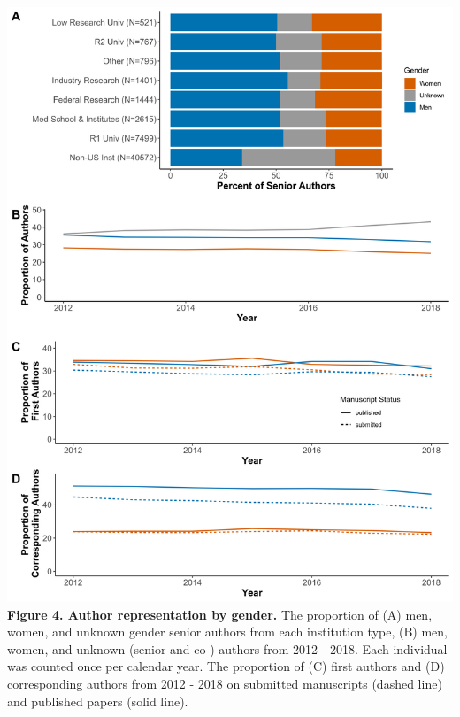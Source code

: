 \documentclass[11pt,]{article}
\begin{document}
\includegraphics{Figure_4.png} \textbf{Figure 4. Author representation
by gender.} The proportion of (A) men, women, and unknown gender senior
authors from each institution type, (B) men, women, and unknown (senior
and co-) authors from 2012 - 2018. Each individual was counted once per
calendar year. The proportion of (C) first authors and (D) corresponding
authors from 2012 - 2018 on submitted manuscripts (dashed line) and
published papers (solid line).

\newpage
\end{document}
